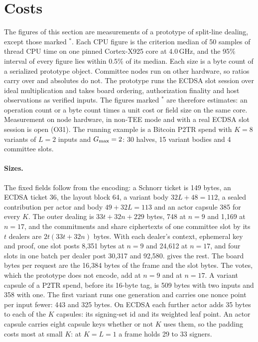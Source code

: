 \section{Costs}\label{sec:eval}

The figures of this section are measurements of a prototype of split-line dealing, except those marked $^{\ast}$. Each CPU figure is the criterion median of 50 samples of thread CPU time on one pinned Cortex-X925 core at 4.0\,GHz, and the 95\% interval of every figure lies within 0.5\% of its median. Each size is a byte count of a serialized prototype object. Committee nodes run on other hardware, so ratios carry over and absolutes do not. The prototype runs the ECDSA slot session over ideal multiplication and takes board ordering, authorization finality and host observations as verified inputs. The figures marked $^{\ast}$ are therefore estimates: an operation count or a byte count times a unit cost or field size on the same core. Measurement on node hardware, in non-TEE mode and with a real ECDSA slot session is open (O31). The running example is a Bitcoin P2TR spend with $K = 8$ variants of $L = 2$ inputs and $G_{\max} = 2$: 30 halves, 15 variant bodies and 4 committee slots.

\paragraph{Sizes.} The fixed fields follow from the encoding: a Schnorr ticket is 149 bytes, an ECDSA ticket 36, the layout block 64, a variant body $32L + 48 = 112$, a sealed contribution per actor and body $49 + 32L = 113$ and an actor capsule 385 for every $K$. The outer dealing is $33t + 32n + 229$ bytes, 748 at $n = 9$ and 1{,}169 at $n = 17$, and the commitments and share ciphertexts of one committee slot by its $t$ dealers are $2t(33t + 32n)$ bytes. With each dealer's context, ephemeral key and proof, one slot posts 8{,}351 bytes at $n = 9$ and 24{,}612 at $n = 17$, and four slots in one batch per dealer post 30{,}317 and 92{,}580.  gives the rest. The board bytes per request are the 16{,}384 bytes of the frame and the slot bytes. The votes, which the prototype does not encode, add  at $n = 9$ and  at $n = 17$. A variant capsule of a P2TR spend, before its 16-byte tag, is 509 bytes with two inputs and 358 with one. The first variant runs one generation and carries one nonce point per input fewer: 443 and 325 bytes. On ECDSA each further actor adds 35 bytes to each of the $K$ capsules: its signing-set id and its weighted leaf point. An actor capsule carries eight capsule keys whether or not $K$ uses them, so the padding costs most at small $K$: at $K = L = 1$ a frame holds 29 to 33 signers.

